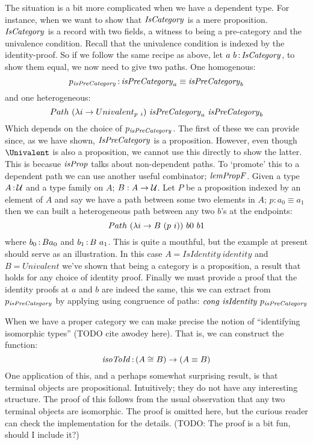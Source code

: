 The situation is a bit more complicated when we have a dependent type. For
instance, when we want to show that $\mathit{IsCategory}$ is a mere proposition.
$\mathit{IsCategory}$ is a record with two fields, a witness to being a pre-category and
the univalence condition. Recall that the univalence condition is indexed by the
identity-proof. So if we follow the same recipe as above, let $a\ b \,\mathord{:}\,
\mathit{IsCategory}$, to show them equal, we now need to give two paths. One homogenous:
%
$$
p_{\mathit{isPreCategory}} \,\mathord{:}\, \mathit{isPreCategory}_a \equiv \mathit{isPreCategory}_b
$$
%
and one heterogeneous:
%
$$
Path\ (\Gl i \to Univalent_{p\ i})\ \isPreCategory_a\ \isPreCategory_b
$$
%
Which depends on the choice of $p_{\mathit{isPreCategory}}$. The first of these we can
provide since, as we have shown, $\mathit{IsPreCategory}$ is a proposition. However,
even though $\Univalent$ is also a proposition, we cannot use this directly to
show the latter. This is becasue $\mathit{isProp}$ talks about non-dependent paths. To
`promote' this to a dependent path we can use another useful combinator;
$\mathit{lemPropF}$. Given a type $A \,\mathord{:}\, \mathcal{U}$ and a type family on $A$; $B : A \to
\mathcal{U}$. Let $P$ be a proposition indexed by an element of $A$ and say we have a
path between some two elements in $A$; $p : a_0 \equiv a_1$ then we can built a
heterogeneous path between any two $b$'s at the endpoints:
%
$$
Path\ (\Gl i \to B\ (p\ i))\ b0\ b1
$$
%
where $b_0 \,\mathord{:}\, B a_0$ and $b_1 \,\mathord{:}\, B\ a_1$. This is quite a mouthful, but the
example at present should serve as an illustration. In this case $A =
\mathit{IsIdentity}\ \mathit{identity}$ and $B = \mathit{Univalent}$ we've shown
that being a category is a proposition, a result that holds for any choice of
identity proof. Finally we must provide a proof that the identity proofs at $a$
and $b$ are indeed the same, this we can extract from $p_{\mathit{isPreCategory}}$ by
applying using congruence of paths: $\congruence\ \mathit{isIdentity}\
p_{\isPreCategory}$

When we have a proper category we can make precise the notion of ``identifying
isomorphic types'' (TODO cite awodey here). That is, we can construct the
function:
%
$$
\mathit{isoToId} \,\mathord{:}\, (A \cong B) \to (A \equiv B)
$$
%
One application of this, and a perhaps somewhat surprising result, is that
terminal objects are propositional. Intuitively; they do not have any
interesting structure. The proof of this follows from the usual observation that
any two terminal objects are isomorphic. The proof is omitted here, but the
curious reader can check the implementation for the details. (TODO: The proof is
a bit fun, should I include it?)

